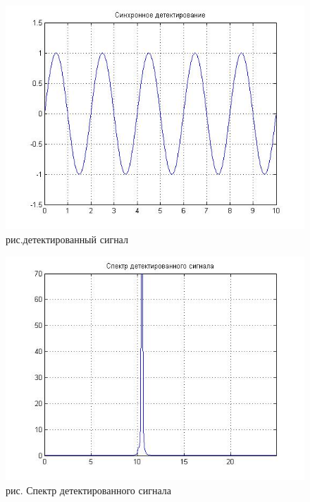 \documentclass[10pt,a4paper]{report}
\begin{document}
\begin{figure}
\begin{center}
\includegraphics[angle=0, scale = 0.9]{7_9.jpg}\newline
рис.детектированный сигнал\newline
\end{center}
\end{figure}
\begin{figure}
\begin{center}
\includegraphics[angle=0, scale = 0.9]{7_10.jpg}\newline
рис. Спектр детектированного сигнала\newline
\end{center}
\end{figure}
\end{document}
